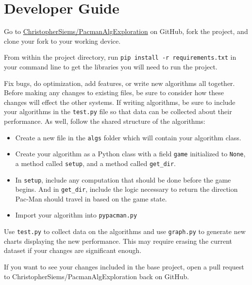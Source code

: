 \documentclass[12pt]{article}
\begin{document}
  \section*{Developer Guide}
    \begin{description}
      \itemsep0pt
      \item[Get the project] Go to \href{https://github.com/ChristopherSiems/PacmanAlgExploration}{ChristopherSiems/PacmanAlgExploration} on GitHub, fork the project, and clone your fork to your working device.
      \item[Install libraries] From within the project directory, run \texttt{pip install -r requirements.txt} in your command line to get the libraries you will need to run the project.
      \item[Make changes] Fix bugs, do optimization, add features, or write new algorithms all together. Before making any changes to existing files, be sure to consider how these changes will effect the other systems. If writing algorithms, be sure to include your algorithms in the \texttt{test.py} file so that data can be collected about their performance. As well, follow the shared structure of the algorithms:
        \begin{itemize}
          \itemsep0pt
          \item Create a new file in the \texttt{algs} folder which will contain your algorithm class.
          \item Create your algorithm as a Python class with a field \texttt{game} initialized to \texttt{None}, a method called \texttt{setup}, and a method called \texttt{get\_dir}.
          \item In \texttt{setup}, include any computation that should be done before the game begins. And in \texttt{get\_dir}, include the logic necessary to return the direction Pac-Man should travel in based on the game state.
          \item Import your algorithm into \texttt{pypacman.py}
        \end{itemize}
      \item[Collect data] Use \texttt{test.py} to collect data on the algorithms and use \texttt{graph.py} to generate new charts displaying the new performance. This may require erasing the current dataset if your changes are significant enough.
      \item[Open a pull request] If you want to see your changes included in the base project, open a pull request to ChristopherSiems/PacmanAlgExploration back on GitHub.
    \end{description}
\end{document}
